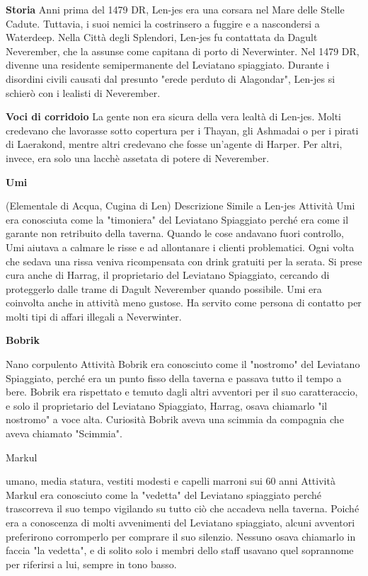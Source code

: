\documentclass{article}
\begin{document}
\textbf{Storia}
Anni prima del 1479 DR, Len-jes era una corsara nel Mare delle Stelle Cadute. Tuttavia, i suoi nemici la costrinsero a fuggire e a nascondersi a Waterdeep. Nella Città degli Splendori, Len-jes fu contattata da Dagult Neverember, che la assunse come capitana di porto di Neverwinter. Nel 1479 DR, divenne una residente semipermanente del Leviatano spiaggiato. Durante i disordini civili causati dal presunto "erede perduto di Alagondar", Len-jes si schierò con i lealisti di Neverember.

\textbf{Voci di corridoio}
La gente non era sicura della vera lealtà di Len-jes. Molti credevano che lavorasse sotto copertura per i Thayan, gli Ashmadai o per i pirati di Laerakond, mentre altri credevano che fosse un'agente di Harper. Per altri, invece, era solo una lacchè assetata di potere di Neverember.\newline\newline

\hypertarget{umi}{\textbf{Umi}} (Elementale di Acqua, Cugina di Len)
Descrizione 
Simile a Len-jes
Attività
Umi era conosciuta come la "timoniera" del Leviatano Spiaggiato perché era come il garante non retribuito della taverna. Quando le cose andavano fuori controllo, Umi aiutava a calmare le risse e ad allontanare i clienti problematici. Ogni volta che sedava una rissa veniva ricompensata con drink gratuiti per la serata. Si prese cura anche di Harrag, il proprietario del Leviatano Spiaggiato, cercando di proteggerlo dalle trame di Dagult Neverember quando possibile. Umi era coinvolta anche in attività meno gustose. Ha servito come persona di contatto per molti tipi di affari illegali a Neverwinter.\newline\newline

\hypertarget{bob}{\textbf{Bobrik}}
Nano corpulento
Attività
Bobrik era conosciuto come il "nostromo" del Leviatano Spiaggiato, perché era un punto fisso della taverna e passava tutto il tempo a bere. Bobrik era rispettato e temuto dagli altri avventori per il suo caratteraccio, e solo il proprietario del Leviatano Spiaggiato, Harrag, osava chiamarlo "il nostromo" a voce alta.
Curiosità
Bobrik aveva una scimmia da compagnia che aveva chiamato "Scimmia".

\hypertarget{mark}{Markul}
umano, media statura, vestiti modesti e capelli marroni sui 60 anni
Attività
Markul era conosciuto come la "vedetta" del Leviatano spiaggiato perché trascorreva il suo tempo vigilando su tutto ciò che accadeva nella taverna. Poiché era a conoscenza di molti avvenimenti del Leviatano spiaggiato, alcuni avventori preferirono corromperlo per comprare il suo silenzio. Nessuno osava chiamarlo in faccia "la vedetta", e di solito solo i membri dello staff usavano quel soprannome per riferirsi a lui, sempre in tono basso.
\end{document}

